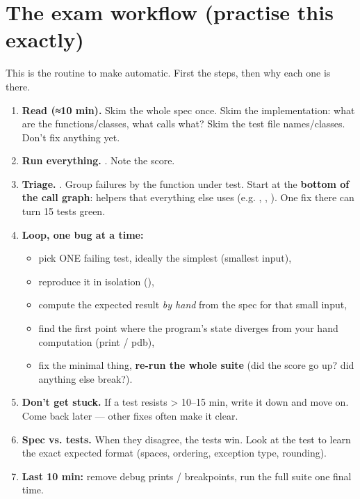 \documentclass[10pt,a4paper]{article}
\begin{document}
\section{The exam workflow (practise this exactly)}
This is the routine to make automatic. First the steps, then why each one is there.
\begin{enumerate}
\item \textbf{Read (≈10 min).} Skim the whole spec once. Skim the implementation: what are the functions/classes, what calls what? Skim the test file names/classes. Don’t fix anything yet.
\item \textbf{Run everything.} . Note the score.
\item \textbf{Triage.} . Group failures by the function under test. Start at the \textbf{bottom of the call graph}: helpers that everything else uses (e.g. , , ). One fix there can turn 15 tests green.
\item \textbf{Loop, one bug at a time:}
\begin{itemize}
\item pick ONE failing test, ideally the simplest (smallest input),
\item reproduce it in isolation (),
\item compute the expected result \emph{by hand} from the spec for that small input,
\item find the first point where the program’s state diverges from your hand computation (print / pdb),
\item fix the minimal thing, \textbf{re-run the whole suite} (did the score go up? did anything else break?).
\end{itemize}
\item \textbf{Don’t get stuck.} If a test resists \textgreater{} 10–15 min, write it down and move on. Come back later — other fixes often make it clear.
\item \textbf{Spec vs. tests.} When they disagree, the tests win. Look at the test to learn the exact expected format (spaces, ordering, exception type, rounding).
\item \textbf{Last 10 min:} remove debug prints / breakpoints, run the full suite one final time.
\end{enumerate}
\end{document}

